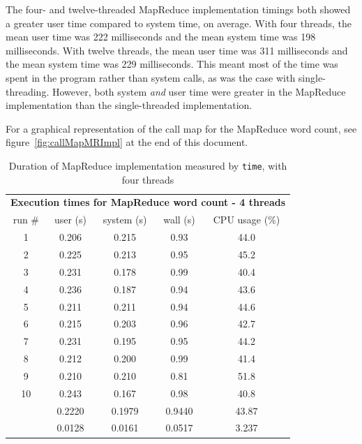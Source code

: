 \documentclass[12pt, letterpaper]{article}
\begin{document}
	The four- and twelve-threaded MapReduce implementation timings both showed a greater user time compared to system time, on average.
	With four threads, the mean user time was 222 milliseconds and the mean system time was 198 milliseconds.
	With twelve threads, the mean user time was 311 milliseconds and the mean system time was 229 milliseconds.
	This meant most of the time was spent in the program rather than system calls, as was the case with single-threading.
	However, both system \textit{and} user time were greater in the MapReduce implementation than the single-threaded implementation.

	For a graphical representation of the call map for the MapReduce word count, see figure~\ref{fig:callMapMRImpl} at the end of this document.
	\begin{table}[h]
	\centering
	\begin{tabular}{ccccc}
	\multicolumn{5}{c}{\cellcolor[HTML]{FFFFC7}\textbf{Execution times for MapReduce word count - 4 threads}} \\
	\cellcolor[HTML]{EFEFEF}run \# & \cellcolor[HTML]{EFEFEF}user (s) & \cellcolor[HTML]{EFEFEF}system (s) & 				\cellcolor[HTML]{EFEFEF}wall (s) & \cellcolor[HTML]{EFEFEF}CPU usage (\%) \\
	1 & 0.206 & 0.215 & 0.93 & 44.0 \\
	2 & 0.225 & 0.213 & 0.95 & 45.2 \\
	3 & 0.231 & 0.178 & 0.99 & 40.4 \\
	4 & 0.236 & 0.187 & 0.94 & 43.6 \\
	5 & 0.211 & 0.211 & 0.94 & 44.6 \\
	6 & 0.215 & 0.203 & 0.96 & 42.7 \\
	7 & 0.231 & 0.195 & 0.95 & 44.2 \\
	8 & 0.212 & 0.200 & 0.99 & 41.4 \\
	9 & 0.210 & 0.210 & 0.81 & 51.8 \\
	10 & 0.243 & 0.167 & 0.98 & 40.8 \\
	\rowcolor[HTML]{D0F0D0} 
	\multicolumn{1}{r}{\cellcolor[HTML]{9AFF99}mean (s)} & 0.2220 & 0.1979 & 0.9440 & 43.87 \\
	\rowcolor[HTML]{ECF4FF} 
	\multicolumn{1}{r}{\cellcolor[HTML]{DAE8FC}std. dev. (s)} & 0.0128 & 0.0161 & 0.0517 & 3.237
	\end{tabular}
	\caption{Duration of MapReduce implementation measured by \texttt{time}, with four threads\label{table:MR4ImplWC}}
	\end{table}
\end{document}

